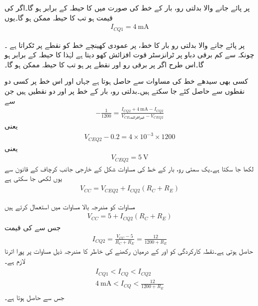  پر پائے جانے والا بدلتی رو، بار کے خط کی صورت میں  کا حیطہ  کے برابر ہو گا۔اگر  کی قیمت  ہو تب  کا حیطہ  ممکن ہو گا۔یوں
\begin{align}
I_{CQ1}=\SI{4}{\milli \ampere}
\end{align}

 پر پائے جانے والا بدلتی رو بار کا خط،  پر عمودی کھینچے خط کو نقطے پر ٹکراتا ہے ۔چونکہ  سے کم برقی دباو پر ٹرانزسٹر قوت افزائش کھو دیتا ہے لہٰذا  کا حیطہ  کے برابر ہو گا۔اس طرح اگر  پر برقی رو  اور  نقطے پر  ہو تب  کا حیطہ  ممکن ہو گا۔

کسی بھی سیدھے خط کی مساوات  سے  حاصل ہوتا ہے جہاں  اور  اس خط پر کسی دو نقطوں سے حاصل کئے جا سکتے ہیں۔بدلتی رو، بار کے خط پر  اور  دو نقطیں ہیں جن سے 
\begin{align*}
-\frac{1}{1200}=\frac{I_{CQ2}+\SI{4}{\milli \ampere}-I_{CQ2}}{V_{CE\textrm{غیرافزائندہ}}-V_{CEQ2}}
\end{align*}
یعنی
\begin{align*}
V_{CEQ2}-0.2=4 \times 10^{-3} \times 1200
\end{align*}
یعنی
\begin{align}\label{مساوات_ٹرانزسٹر_بدلتی_رو_بار_خط_مساوات_مثال}
V_{CEQ2}=\SI{5}{\volt}
\end{align}
لکھا جا سکتا ہے۔یک سمتی رو، بار کے خط کی مساوات شکل  کے خارجی جانب کرچاف کے قانون سے یوں لکھی جا سکتی ہے
\begin{align}
V_{CC}=V_{CEQ2}+I_{CQ2} \left(R_C+R_E \right)
\end{align}

مساوات  کو مندرجہ بالا مساوات میں استعمال کرتے ہیں
\begin{align*}
V_{CC}=5+I_{CQ2} \left(R_C+R_E \right)
\end{align*}
جس سے  کی قیمت
\begin{align}
I_{CQ2}=\frac{V_{CC}-5}{R_C+R_E}=\frac{12}{1200+R_E}
\end{align}
حاصل ہوتی ہے۔نقطہ کارکردگی کو  اور  کے درمیان رکھنے کی خاطر  کا مندرجہ ذیل مساوات پر پورا اترنا لازم ہے۔ 
\begin{gather}
\begin{aligned}\label{مساوات_ٹرانزسٹر_حدود_نکتہ_کارکردگی}
I_{CQ1} < I_{CQ}< I_{CQ2}\\
\SI{4}{\milli \ampere} < I_{CQ}< \frac{12}{1200+R_E}
\end{aligned}
\end{gather}
جس سے   حاصل ہوتا ہے۔

